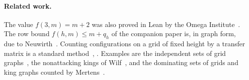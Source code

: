 \paragraph{Related work.} The value $f(3,m)=m+2$ was also proved
in Lean by the Omega Institute~\cite{trureturing2026}. The row bound
$f(h,m)\le m+q_h$ of the companion paper is, in graph form, due to
Neuwirth~\cite[Theorem~1(ii) and Proposition~17]{neuwirth2001}. Counting
configurations on a grid of fixed height by a transfer matrix is a standard
method~\cite[Section~4.7]{stanley2012}, \cite[Proposition~V.6]{flajolet2009}.
Examples are the independent sets of grid
graphs~\cite{calkinwilf1998,euler2005}, the nonattacking kings of
Wilf~\cite{wilf1995}, and the dominating sets of grids and king graphs counted
by Mertens~\cite{mertens2024}.
